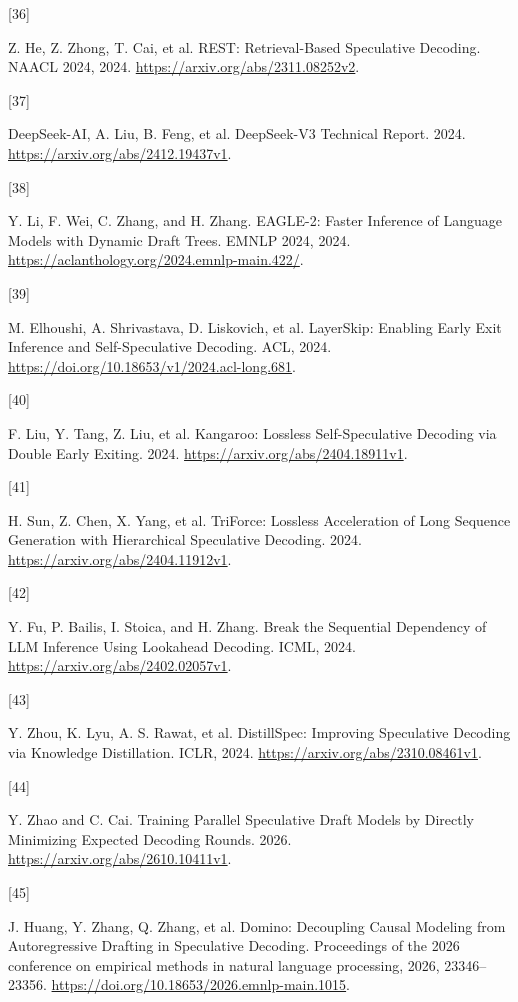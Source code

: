 \documentclass[
  a4paper,
  UTF8,
  fontset=none,
  zihao=5]{ctexart}
\newlength{\cslhangindent}
\newlength{\csllabelwidth}
\newenvironment{CSLReferences}[2] %
 {\begin{list}{}{%
  \setlength{\itemindent}{0pt}
  \setlength{\leftmargin}{0pt}
  \setlength{\parsep}{0pt}
  \ifodd #1
   \setlength{\leftmargin}{\cslhangindent}
   \setlength{\itemindent}{-1\cslhangindent}
  \fi
  \setlength{\itemsep}{#2\baselineskip}}}
 {\end{list}}
\newcommand{\CSLLeftMargin}[1]{\parbox[t]{\csllabelwidth}{\strut#1\strut}}
\newcommand{\CSLRightInline}[1]{\parbox[t]{\linewidth - \csllabelwidth}{\strut#1\strut}}
\begin{document}
\begin{CSLReferences}{0}{0}
\CSLLeftMargin{{[}36{]} }%
\CSLRightInline{Z. He, Z. Zhong, T. Cai, et al. {REST: Retrieval-Based
Speculative Decoding}. NAACL 2024, 2024.
\url{https://arxiv.org/abs/2311.08252v2}.}

\CSLLeftMargin{{[}37{]} }%
\CSLRightInline{DeepSeek-AI, A. Liu, B. Feng, et al. {DeepSeek-V3
Technical Report}. 2024. \url{https://arxiv.org/abs/2412.19437v1}.}

\CSLLeftMargin{{[}38{]} }%
\CSLRightInline{Y. Li, F. Wei, C. Zhang, and H. Zhang. {EAGLE-2: Faster
Inference of Language Models with Dynamic Draft Trees}. EMNLP 2024,
2024. \url{https://aclanthology.org/2024.emnlp-main.422/}.}

\CSLLeftMargin{{[}39{]} }%
\CSLRightInline{M. Elhoushi, A. Shrivastava, D. Liskovich, et al.
{LayerSkip: Enabling Early Exit Inference and Self-Speculative
Decoding}. ACL, 2024.
\url{https://doi.org/10.18653/v1/2024.acl-long.681}.}

\CSLLeftMargin{{[}40{]} }%
\CSLRightInline{F. Liu, Y. Tang, Z. Liu, et al. {Kangaroo: Lossless
Self-Speculative Decoding via Double Early Exiting}. 2024.
\url{https://arxiv.org/abs/2404.18911v1}.}

\CSLLeftMargin{{[}41{]} }%
\CSLRightInline{H. Sun, Z. Chen, X. Yang, et al. {TriForce: Lossless
Acceleration of Long Sequence Generation with Hierarchical Speculative
Decoding}. 2024. \url{https://arxiv.org/abs/2404.11912v1}.}

\CSLLeftMargin{{[}42{]} }%
\CSLRightInline{Y. Fu, P. Bailis, I. Stoica, and H. Zhang. {Break the
Sequential Dependency of LLM Inference Using Lookahead Decoding}. ICML,
2024. \url{https://arxiv.org/abs/2402.02057v1}.}

\CSLLeftMargin{{[}43{]} }%
\CSLRightInline{Y. Zhou, K. Lyu, A. S. Rawat, et al. {DistillSpec:
Improving Speculative Decoding via Knowledge Distillation}. ICLR, 2024.
\url{https://arxiv.org/abs/2310.08461v1}.}

\CSLLeftMargin{{[}44{]} }%
\CSLRightInline{Y. Zhao and C. Cai. {Training Parallel Speculative Draft
Models by Directly Minimizing Expected Decoding Rounds}. 2026.
\url{https://arxiv.org/abs/2610.10411v1}.}

\CSLLeftMargin{{[}45{]} }%
\CSLRightInline{J. Huang, Y. Zhang, Q. Zhang, et al. {Domino: Decoupling
Causal Modeling from Autoregressive Drafting in Speculative Decoding}.
Proceedings of the 2026 conference on empirical methods in natural
language processing, 2026, 23346--23356.
\url{https://doi.org/10.18653/2026.emnlp-main.1015}.}


\end{CSLReferences}
\end{document}
